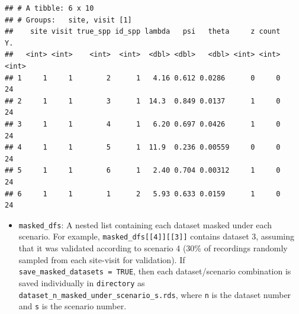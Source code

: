 \documentclass[
]{article}
\newenvironment{Shaded}{\begin{snugshade}}{\end{snugshade}}
\newcommand{\CommentTok}[1]{\textcolor[rgb]{0.56,0.35,0.01}{\textit{#1}}}
\newcommand{\DecValTok}[1]{\textcolor[rgb]{0.00,0.00,0.81}{#1}}
\newcommand{\FunctionTok}[1]{\textcolor[rgb]{0.13,0.29,0.53}{\textbf{#1}}}
\newcommand{\NormalTok}[1]{#1}
\newcommand{\OtherTok}[1]{\textcolor[rgb]{0.56,0.35,0.01}{#1}}
\newcommand{\SpecialCharTok}[1]{\textcolor[rgb]{0.81,0.36,0.00}{\textbf{#1}}}
\providecommand{\tightlist}{%
  \setlength{\itemsep}{0pt}\setlength{\parskip}{0pt}}
\begin{document}
\begin{verbatim}
## # A tibble: 6 x 10
## # Groups:   site, visit [1]
##    site visit true_spp id_spp lambda   psi   theta     z count    Y.
##   <int> <int>    <int>  <int>  <dbl> <dbl>   <dbl> <int> <int> <int>
## 1     1     1        2      1   4.16 0.612 0.0286      0     0    24
## 2     1     1        3      1  14.3  0.849 0.0137      1     0    24
## 3     1     1        4      1   6.20 0.697 0.0426      1     0    24
## 4     1     1        5      1  11.9  0.236 0.00559     0     0    24
## 5     1     1        6      1   2.40 0.704 0.00312     1     0    24
## 6     1     1        1      2   5.93 0.633 0.0159      1     0    24
\end{verbatim}

\linespread{1}

\begin{itemize}
\tightlist
\item
  \texttt{masked\_dfs}: A nested list containing each dataset masked under each scenario. For example, \texttt{masked\_dfs{[}{[}4{]}{]}{[}{[}3{]}{]}} contains dataset 3, assuming that it was validated according to scenario 4 (30\% of recordings randomly sampled from each site-visit for validation). If \texttt{save\_masked\_datasets\ =\ TRUE}, then each dataset/scenario combination is saved individually in \texttt{directory} as \texttt{dataset\_n\_masked\_under\_scenario\_s.rds}, where \texttt{n} is the dataset number and \texttt{s} is the scenario number.
\end{itemize}

\linespread{1}

\begin{Shaded}
\end{Shaded}
\end{document}
